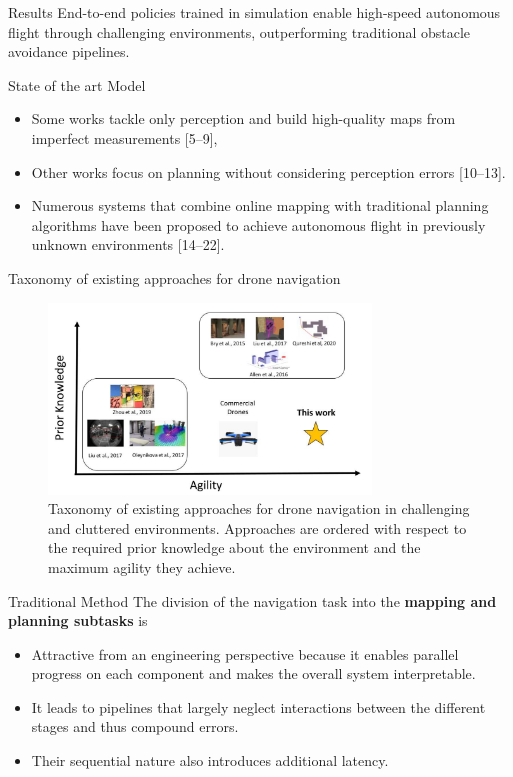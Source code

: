 \documentclass{beamer}
\begin{document}
\begin{frame}{Results}
	End-to-end policies trained in simulation enable high-speed autonomous flight through challenging environments, outperforming traditional obstacle avoidance pipelines.
\end{frame}

\begin{frame}{State of the art Model}
	\begin{itemize}
		\item Some works tackle only perception and build high-quality maps from imperfect measurements [5–9], 
		\item Other works focus on planning without considering perception errors [10–13]. 
		\item Numerous systems that combine online mapping with traditional planning algorithms have been proposed to achieve autonomous flight in previously unknown environments [14–22]. 
	\end{itemize}
\end{frame}

\begin{frame}{Taxonomy of existing approaches for drone navigation}
	\centering
	\begin{figure}
		\includegraphics[height=2in]{images/taxonomy_navigation.png}
		\caption{Taxonomy of existing approaches for drone navigation in challenging and cluttered environments. Approaches are ordered with
respect to the required prior knowledge about the environment and the maximum agility they achieve.}
	\end{figure}
\end{frame}

\begin{frame}{Traditional Method}
	The division of the navigation task into the \textbf{mapping and planning subtasks} is 
	\begin{itemize}
		\item Attractive from an engineering perspective because it enables parallel progress on each component and makes the overall system interpretable. 
		\item It leads to pipelines that largely neglect interactions between the different stages and thus compound errors. 
		\item Their sequential nature also introduces additional latency.
	\end{itemize}
\end{frame}
\end{document}
